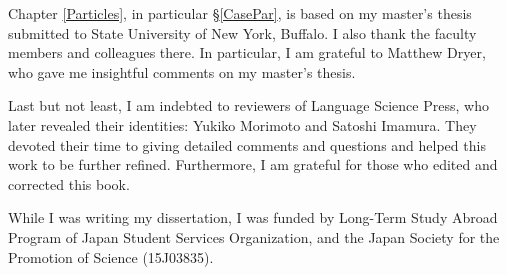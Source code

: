 \begin{refsection}
Chapter \ref{Particles}, in particular \S \ref{CasePar}, is based on my master's thesis
submitted to State University of New York, Buffalo.
I also thank the faculty members and colleagues there.
In particular, I am grateful to Matthew Dryer,
who gave me insightful comments on my master's thesis.

Last but not least,
I am indebted to reviewers of Language Science Press,
who later revealed their identities: Yukiko Morimoto and Satoshi Imamura.
They devoted their time to giving detailed comments and questions and
helped this work to be further refined.
Furthermore, I am grateful for those who edited and corrected this book.

While I was writing my dissertation,
I was funded by Long-Term Study Abroad Program of Japan Student Services Organization,
and the Japan Society for the Promotion of Science (15J03835).

\end{refsection}


